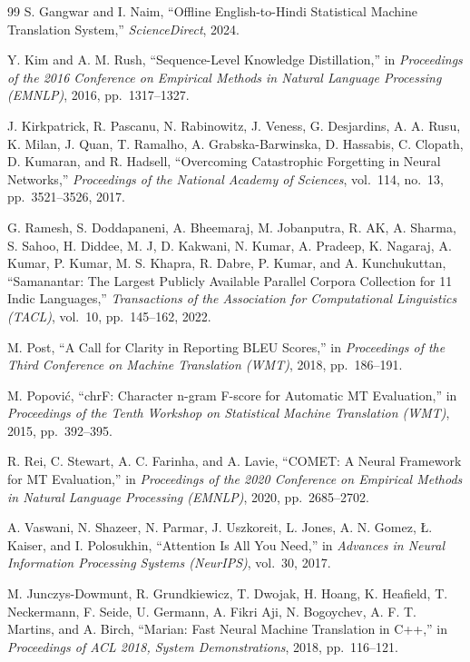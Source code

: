 {\begin{thebibliography}{99}
S. Gangwar and I. Naim, ``Offline English-to-Hindi Statistical Machine
Translation System,'' \textit{ScienceDirect}, 2024.

Y. Kim and A. M. Rush, ``Sequence-Level Knowledge Distillation,'' in
\textit{Proceedings of the 2016 Conference on Empirical Methods in Natural
Language Processing (EMNLP)}, 2016, pp.~1317--1327.

J. Kirkpatrick, R. Pascanu, N. Rabinowitz, J. Veness, G. Desjardins,
A. A. Rusu, K. Milan, J. Quan, T. Ramalho, A. Grabska-Barwinska, D. Hassabis,
C. Clopath, D. Kumaran, and R. Hadsell, ``Overcoming Catastrophic Forgetting in
Neural Networks,'' \textit{Proceedings of the National Academy of Sciences},
vol.~114, no.~13, pp.~3521--3526, 2017.

G. Ramesh, S. Doddapaneni, A. Bheemaraj, M. Jobanputra, R. AK, A. Sharma,
S. Sahoo, H. Diddee, M. J, D. Kakwani, N. Kumar, A. Pradeep, K. Nagaraj,
A. Kumar, P. Kumar, M. S. Khapra, R. Dabre, P. Kumar, and A. Kunchukuttan,
``Samanantar: The Largest Publicly Available Parallel Corpora Collection for
11 Indic Languages,'' \textit{Transactions of the Association for Computational
Linguistics (TACL)}, vol.~10, pp.~145--162, 2022.

M. Post, ``A Call for Clarity in Reporting BLEU Scores,'' in \textit{Proceedings
of the Third Conference on Machine Translation (WMT)}, 2018, pp.~186--191.

M. Popovi\'{c}, ``chrF: Character n-gram F-score for Automatic MT Evaluation,''
in \textit{Proceedings of the Tenth Workshop on Statistical Machine Translation
(WMT)}, 2015, pp.~392--395.

R. Rei, C. Stewart, A. C. Farinha, and A. Lavie, ``COMET: A Neural Framework for
MT Evaluation,'' in \textit{Proceedings of the 2020 Conference on Empirical
Methods in Natural Language Processing (EMNLP)}, 2020, pp.~2685--2702.

A. Vaswani, N. Shazeer, N. Parmar, J. Uszkoreit, L. Jones, A. N. Gomez,
{\L}. Kaiser, and I. Polosukhin, ``Attention Is All You Need,'' in
\textit{Advances in Neural Information Processing Systems (NeurIPS)}, vol.~30,
2017.

M. Junczys-Dowmunt, R. Grundkiewicz, T. Dwojak, H. Hoang, K. Heafield,
T. Neckermann, F. Seide, U. Germann, A. Fikri Aji, N. Bogoychev,
A. F. T. Martins, and A. Birch, ``Marian: Fast Neural Machine Translation in
C++,'' in \textit{Proceedings of ACL 2018, System Demonstrations}, 2018,
pp.~116--121.


\end{thebibliography}}
